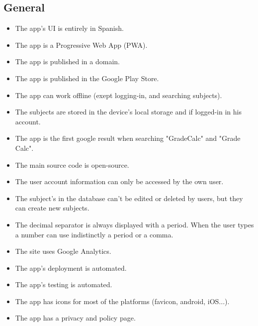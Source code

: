 \subsection*{General}
\begin{itemize}[leftmargin=2cm]
    \item[\nextTask{}\label{req:x}] The app's UI is entirely in Spanish.
    \item[\nextTask{}\label{req:x}] The app is a Progressive Web App (PWA).
    \item[\nextTask{}\label{req:x}] The app is published in a domain.
    \item[\nextTask{}\label{req:x}] The app is published in the Google Play Store.
    \item[\nextTask{}\label{req:x}] The app can work offline (exept logging-in, and searching subjects).
    \item[\nextTask{}\label{req:x}] The subjects are stored in the device's local storage and if logged-in in his account.
    \item[\nextTask{}\label{req:x}] The app is the first google result when searching "GradeCalc" and "Grade Calc".
    \item[\nextTask{}\label{req:x}] The main source code is open-source.
    \item[\nextTask{}\label{req:x}] The user account information can only be accessed by the own user.
    \item[\nextTask{}\label{req:x}] The subject's in the database can't be edited or deleted by users, but they can create new subjects.
    \item[\nextTask{}\label{req:x}] The decimal separator is always displayed with a period. When the user types a number can use indistinctly a period or a comma.
    \item[\nextTask{}\label{req:x}] The site uses Google Analytics.
    \item[\nextTask{}\label{req:x}] The app's deployment is automated.
    \item[\nextTask{}\label{req:x}] The app's testing is automated.
    \item[\nextTask{}\label{req:x}] The app has icons for most of the platforms (favicon, android, iOS...).
    \item[\nextTask{}\label{req:x}] The app has a privacy and policy page.
\end{itemize}

